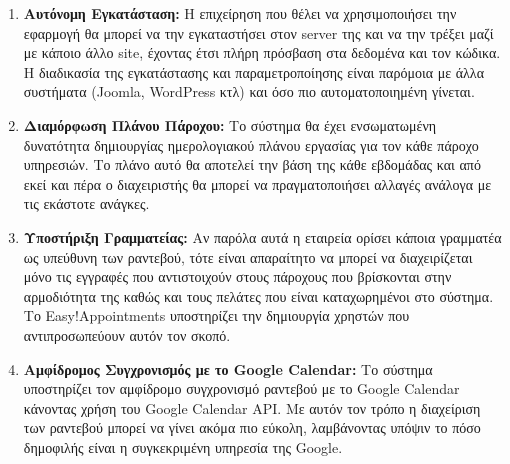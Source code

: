 \begin{enumerate}
\item {\bf Αυτόνομη Εγκατάσταση:} Η επιχείρηση που θέλει να χρησιμοποιήσει την εφαρμογή θα μπορεί να την εγκαταστήσει στον server της και να την τρέξει μαζί με κάποιο άλλο site, έχοντας έτσι πλήρη πρόσβαση στα δεδομένα και τον κώδικα. Η διαδικασία της εγκατάστασης και παραμετροποίησης είναι παρόμοια με άλλα συστήματα (Joomla, WordPress κτλ) και όσο πιο αυτοματοποιημένη γίνεται.

\item {\bf Διαμόρφωση Πλάνου Πάροχου:} Το σύστημα θα έχει ενσωματωμένη δυνατότητα δημιουργίας ημερολογιακού πλάνου εργασίας για τον κάθε πάροχο υπηρεσιών. Το πλάνο αυτό θα αποτελεί την βάση της κάθε εβδομάδας και από εκεί και πέρα ο διαχειριστής θα μπορεί να πραγματοποιήσει αλλαγές ανάλογα με τις εκάστοτε ανάγκες. 

\item {\bf Υποστήριξη Γραμματείας:} Αν παρόλα αυτά η εταιρεία ορίσει κάποια γραμματέα ως υπεύθυνη των ραντεβού, τότε είναι απαραίτητο να μπορεί να διαχειρίζεται μόνο τις εγγραφές που αντιστοιχούν στους πάροχους που βρίσκονται στην αρμοδιότητα της καθώς και τους πελάτες που είναι καταχωρημένοι στο σύστημα. Το Easy!Appointments υποστηρίζει την δημιουργία χρηστών που αντιπροσωπεύουν αυτόν τον σκοπό.

\item {\bf Αμφίδρομος Συγχρονισμός με το Google Calendar:} Το σύστημα υποστηρίζει τον αμφίδρομο συγχρονισμό ραντεβού με το Google Calendar κάνοντας χρήση του Google Calendar API. Με αυτόν τον τρόπο η διαχείριση των ραντεβού μπορεί να γίνει ακόμα πιο εύκολη, λαμβάνοντας υπόψιν το πόσο δημοφιλής είναι η συγκεκριμένη υπηρεσία της Google.
\end{enumerate}

